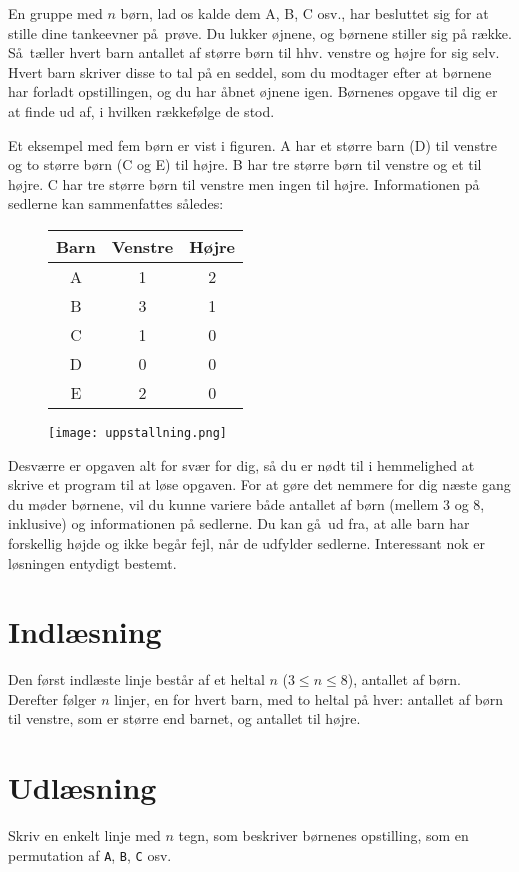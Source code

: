 En gruppe med $n$ børn, lad os kalde dem A, B, C osv., har besluttet sig for at stille dine tankeevner på prøve.
Du lukker øjnene, og børnene stiller sig på række.
Så tæller hvert barn antallet af større børn til hhv. venstre og højre for sig selv.
Hvert barn skriver disse to tal på en seddel, som du modtager efter at børnene har forladt opstillingen, og du har åbnet øjnene igen.
Børnenes opgave til dig er at finde ud af, i hvilken rækkefølge de stod.

Et eksempel med fem børn er vist i figuren.
A har et større barn (D) til venstre og to større børn (C og E) til højre.
B har tre større børn til venstre og et til højre.
C har tre større børn til venstre men ingen til højre. 
Informationen på sedlerne kan sammenfattes således:

\begin{figure}[h!]
  \centering

\begin{minipage}{.5\textwidth}
    \begin{tabular}[b]{|c|c|c|}
    \hline
      Barn&Venstre&Højre\\\hline
      A&1&2\\
      B&3&1\\
      C&1&0\\
      D&0&0\\
      E&2&0\\\hline
    \end{tabular}
\end{minipage}%
\begin{minipage}{.5\textwidth}
    \texttt{[image: uppstallning.png]}
\end{minipage}

\end{figure}

Desværre er opgaven alt for svær for dig, så du er nødt til i hemmelighed at skrive et program til at løse opgaven.
For at gøre det nemmere for dig næste gang du møder børnene, vil du kunne variere både antallet af børn (mellem $3$ og $8$, inklusive) og informationen på sedlerne.
Du kan gå ud fra, at alle barn har forskellig højde og ikke begår fejl, når de udfylder sedlerne.
Interessant nok er løsningen entydigt bestemt.

\section*{Indlæsning}
Den først indlæste linje består af et heltal $n$ ($3 \le n \le 8$), antallet af børn.
Derefter følger $n$ linjer, en for hvert barn,  med to heltal på hver: antallet af børn til venstre, som er større end barnet, og antallet til højre.

\section*{Udlæsning}
Skriv en enkelt linje med $n$ tegn, som beskriver børnenes opstilling, som en permutation af \texttt{A}, \texttt{B}, \texttt{C} osv.
